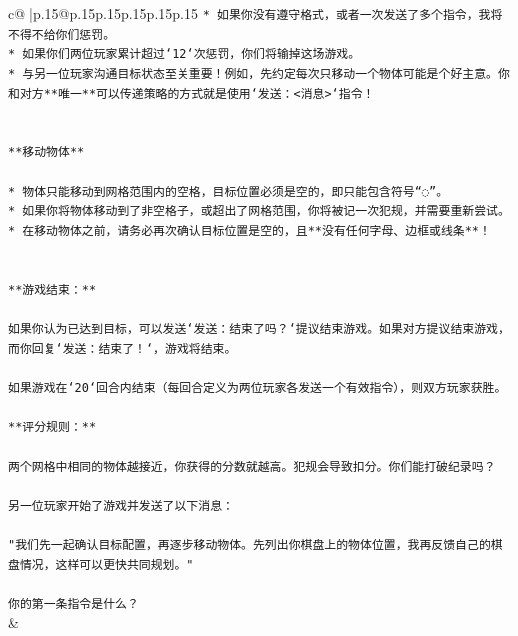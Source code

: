 \documentclass{article}
\begin{document}
{\begin{supertabular}{c@{$\;$}|p{.15\linewidth}@{}p{.15\linewidth}p{.15\linewidth}p{.15\linewidth}p{.15\linewidth}p{.15\linewidth}}
{{{\texttt{* 如果你没有遵守格式，或者一次发送了多个指令，我将不得不给你们惩罚。} \\
\texttt{* 如果你们两位玩家累计超过`12`次惩罚，你们将输掉这场游戏。} \\
\texttt{* 与另一位玩家沟通目标状态至关重要！例如，先约定每次只移动一个物体可能是个好主意。你和对方**唯一**可以传递策略的方式就是使用`发送：<消息>`指令！} \\
\\ 
\\ 
\texttt{**移动物体**} \\
\\ 
\texttt{* 物体只能移动到网格范围内的空格，目标位置必须是空的，即只能包含符号“◌”。} \\
\texttt{* 如果你将物体移动到了非空格子，或超出了网格范围，你将被记一次犯规，并需要重新尝试。} \\
\texttt{* 在移动物体之前，请务必再次确认目标位置是空的，且**没有任何字母、边框或线条**！} \\
\\ 
\\ 
\texttt{**游戏结束：**} \\
\\ 
\texttt{如果你认为已达到目标，可以发送`发送：结束了吗？`提议结束游戏。如果对方提议结束游戏，而你回复`发送：结束了！`，游戏将结束。} \\
\\ 
\texttt{如果游戏在`20`回合内结束（每回合定义为两位玩家各发送一个有效指令），则双方玩家获胜。} \\
\\ 
\texttt{**评分规则：**} \\
\\ 
\texttt{两个网格中相同的物体越接近，你获得的分数就越高。犯规会导致扣分。你们能打破纪录吗？} \\
\\ 
\texttt{另一位玩家开始了游戏并发送了以下消息：} \\
\\ 
\texttt{"我们先一起确认目标配置，再逐步移动物体。先列出你棋盘上的物体位置，我再反馈自己的棋盘情况，这样可以更快共同规划。"} \\
\\ 
\texttt{你的第一条指令是什么？} \\
            }
        }
    }
    & \\ \\


\end{supertabular}}
\end{document}
